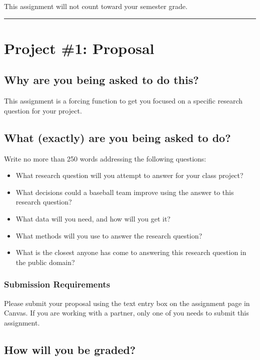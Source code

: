 \documentclass{article}
\begin{document}
      This assignment will not count toward your semester grade.\\

  \hrule
  \section*{\sc Project \#1: Proposal}

    \subsection*{\sc Why are you being asked to do this?}

      This assignment is a forcing function to get you focused on a specific research question for your project.

    \subsection*{\sc What (exactly) are you being asked to do?}

      Write no more than 250 words addressing the following questions:
      \begin{itemize}
        \item What research question will you attempt to answer for your class project?
        \item What decisions could a baseball team improve using the answer to this research question?
        \item What data will you need, and how will you get it?
        \item What methods will you use to answer the research question?
        \item What is the closest anyone has come to answering this research question in the public domain?
      \end{itemize}

      \subsubsection*{\sc Submission Requirements}

        Please submit your proposal using the text entry box on the assignment page in Canvas. If you are working with a partner, only one of you needs to submit this assignment.

    \subsection*{\sc How will you be graded?}
\end{document}
